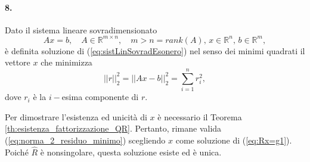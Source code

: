\paragraph{8.} Dato il sistema lineare sovradimensionato
\begin{equation}\label{eq:sistLinSovradEsonero}
    Ax=b,\quad A\in\mathbb R^{m\times n},\quad m>n=rank(A),\, x\in\mathbb R^n,\, b\in\mathbb R^m,
\end{equation}
è definita soluzione di (\ref{eq:sistLinSovradEsonero}) nel senso dei minimi quadrati il vettore $x$ che minimizza
\begin{equation*}
    ||r||_2^2=||Ax-b||_2^2=\sum_{i=1}^nr_i^2,
\end{equation*}
dove $r_i$ è la $i-$esima componente di $r$.

\noindent Per dimostrare l'esistenza ed unicità di $x$ è necessario il Teorema \ref{th:esistenza_fattorizzazione_QR}. Pertanto, rimane valida (\ref{eq:norma_2_residuo_minimo}) scegliendo $x$ come soluzione di (\ref{eq:Rx=g1}). Poiché $\widehat R$ è nonsingolare, questa soluzione esiste ed è unica.